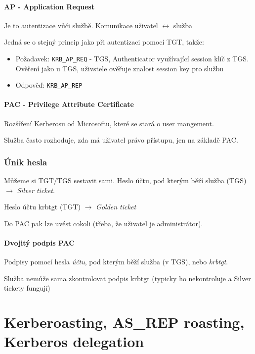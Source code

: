 \documentclass[10pt,a4paper]{article}
\begin{document}
\paragraph{AP - Application Request}
Je to autentizace vůči službě. 
Komunikace uživatel $\leftrightarrow$ služba

Jedná se o stejný princip jako při autentizaci pomocí TGT, takže:
\begin{itemize}\setlength\itemsep{0em}
	\item Požadavek: \texttt{KRB\_AP\_REQ} - TGS, Authenticator využívající session klíč z TGS. Ověření jako u TGS, uživstele ověřuje znalost session key pro službu
	\item Odpověď: \texttt{KRB\_AP\_REP}
\end{itemize}


\paragraph{PAC - Privilege Attribute Certificate}
Rozšíření Kerberosu od Microsoftu, které se stará o user mangement.

Služba často rozhoduje, zda má uživatel právo přístupu, jen na základě PAC.


\subsubsection*{Únik hesla}
Můžeme si TGT/TGS sestavit sami. Heslo účtu, pod kterým běží služba (TGS) $\to$ \textit{Silver ticket}.

Heslo účtu krbtgt (TGT) $\to$ \textit{Golden ticket}

Do PAC pak lze uvést cokoli (třeba, že uživatel je administrátor).

\paragraph{Dvojitý podpis PAC}

Podpisy pomocí hesla \textit{účtu}, pod kterým běží služba (v TGS), nebo \textit{krbtgt}.

Služba nemůže sama zkontrolovat podpis krbtgt (typicky ho nekontroluje a Silver tickety fungují)
	

\section{Kerberoasting, AS\_REP roasting, Kerberos delegation}
\end{document}
